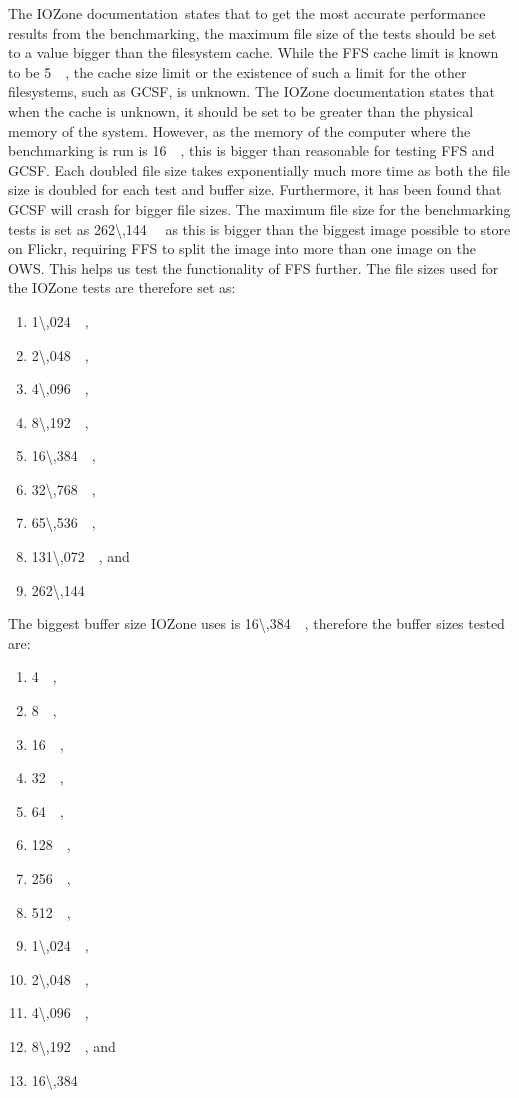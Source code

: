 The IOZone documentation\,\cite{iozoneIozoneFilesystemBenchmark} states that to get the most accurate performance results from the benchmarking, the maximum file size of the tests should be set to a value bigger than the filesystem cache. While the \gls{FFS} cache limit is known to be \SI{5}{\mega\byte}, the cache size limit or the existence of such a limit for the other filesystems, such as \gls{GCSF}, is unknown. The IOZone documentation states that when the cache is unknown, it should be set to be greater than the physical memory of the system. However, as the memory of the computer where the benchmarking is run is \SI{16}{\giga\byte}, this is bigger than reasonable for testing \gls{FFS} and \gls{GCSF}. Each doubled file size takes exponentially much more time as both the file size is doubled for each test and buffer size. Furthermore, it has been found that \gls{GCSF} will crash for bigger file sizes. The maximum file size for the benchmarking tests is set as \SI{262\,144}{\kilo\byte} as this is bigger than the biggest image possible to store on Flickr, requiring \gls{FFS} to split the image into more than one image on the \gls{OWS}. This helps us test the functionality of FFS further. The file sizes used for the IOZone tests are therefore set as:
\begin{enumerate}
	\item \SI{1\,024}{\kilo\byte},
	\item \SI{2\,048}{\kilo\byte},
	\item \SI{4\,096}{\kilo\byte},
	\item \SI{8\,192}{\kilo\byte},
	\item \SI{16\,384}{\kilo\byte},
	\item \SI{32\,768}{\kilo\byte},
	\item \SI{65\,536}{\kilo\byte},
	\item \SI{131\,072}{\kilo\byte}, and
	\item \SI{262\,144}{\kilo\byte}
\end{enumerate}
The biggest buffer size IOZone uses is \SI{16\,384}{\kilo\byte}, therefore the buffer sizes tested are:
\begin{enumerate}
	\item \SI{4}{\kilo\byte},
	\item \SI{8}{\kilo\byte},
	\item \SI{16}{\kilo\byte},
	\item \SI{32}{\kilo\byte},
	\item \SI{64}{\kilo\byte},
	\item \SI{128}{\kilo\byte},
	\item \SI{256}{\kilo\byte},
	\item \SI{512}{\kilo\byte},
	\item \SI{1\,024}{\kilo\byte},
	\item \SI{2\,048}{\kilo\byte},
	\item \SI{4\,096}{\kilo\byte},
	\item \SI{8\,192}{\kilo\byte}, and
	\item \SI{16\,384}{\kilo\byte}
\end{enumerate}
